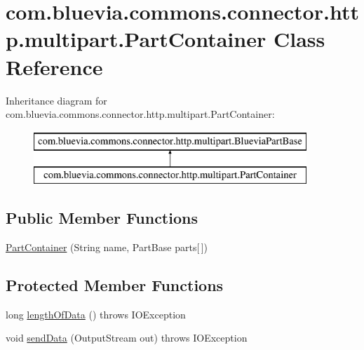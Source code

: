 \hypertarget{classcom_1_1bluevia_1_1commons_1_1connector_1_1http_1_1multipart_1_1PartContainer}{
\section{com.bluevia.commons.connector.http.multipart.PartContainer Class Reference}
\label{classcom_1_1bluevia_1_1commons_1_1connector_1_1http_1_1multipart_1_1PartContainer}
}
Inheritance diagram for com.bluevia.commons.connector.http.multipart.PartContainer:\begin{figure}[H]
\begin{center}
\leavevmode
\includegraphics[height=2.000000cm]{classcom_1_1bluevia_1_1commons_1_1connector_1_1http_1_1multipart_1_1PartContainer}
\end{center}
\end{figure}
\subsection*{Public Member Functions}
\begin{DoxyCompactItemize}
\item 
\hyperlink{classcom_1_1bluevia_1_1commons_1_1connector_1_1http_1_1multipart_1_1PartContainer_ac59d3287385c28433404480c8e435458}{PartContainer} (String name, PartBase parts\mbox{[}$\,$\mbox{]})
\end{DoxyCompactItemize}
\subsection*{Protected Member Functions}
\begin{DoxyCompactItemize}
\item 
long \hyperlink{classcom_1_1bluevia_1_1commons_1_1connector_1_1http_1_1multipart_1_1PartContainer_aa953eafc21e332d8fd4248d8495a03dd}{lengthOfData} ()  throws IOException 
\item 
void \hyperlink{classcom_1_1bluevia_1_1commons_1_1connector_1_1http_1_1multipart_1_1PartContainer_a1b53871b587fa90a7786e2f6bdb890c3}{sendData} (OutputStream out)  throws IOException 
\end{DoxyCompactItemize}


